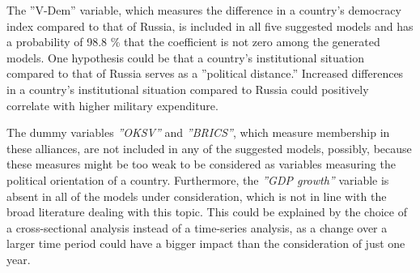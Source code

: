\documentclass[12pt,a4paper]{article}
\begin{document}
The ''V-Dem'' variable, which measures the difference in a country's democracy index compared to that of Russia, is included in all five suggested models and has a probability of 98.8 \% that the coefficient is not zero among the generated models. One hypothesis could be that a country's institutional situation compared to that of Russia serves as a ''political distance.'' Increased differences in a country's institutional situation compared to Russia could positively correlate with higher military expenditure.

The dummy variables \textit{''OKSV''} and \textit{''BRICS''}, which measure membership in these alliances, are not included in any of the suggested models, possibly, because these measures might be too weak to be considered as variables measuring the political orientation of a country. Furthermore, the \textit{''GDP growth''} variable is absent in all of the models under consideration, which is not in line with the broad literature dealing with this topic. This could be explained by the choice of a cross-sectional analysis instead of a time-series analysis, as a change over a larger time period could have a bigger impact than the consideration of just one year.  
\end{document}

